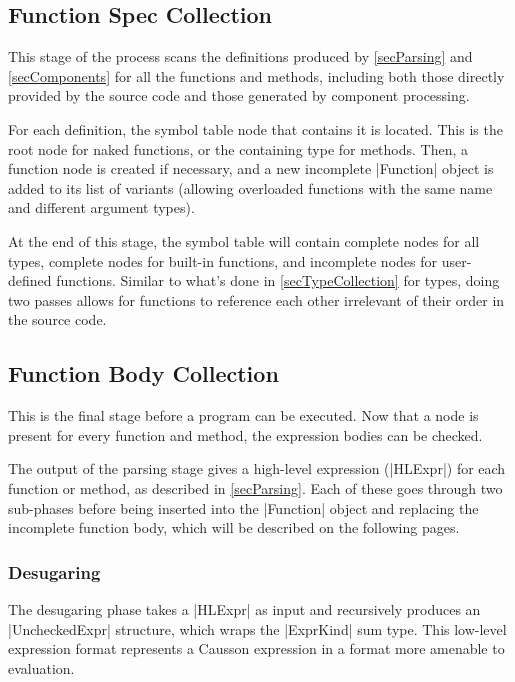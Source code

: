 \documentclass[11pt]{report}
\begin{document}
\subsection{Function Spec Collection} \label{secFuncSpecCollection}

This stage of the process scans the definitions produced by \cref{secParsing} and \cref{secComponents} for all the functions and methods, including both those directly provided by the source code and those generated by component processing.

For each definition, the symbol table node that contains it is located. This is the root node for naked functions, or the containing type for methods. Then, a function node is created if necessary, and a new incomplete |Function| object is added to its list of variants (allowing overloaded functions with the same name and different argument types).

At the end of this stage, the symbol table will contain complete nodes for all types, complete nodes for built-in functions, and incomplete nodes for user-defined functions. Similar to what's done in \cref{secTypeCollection} for types, doing two passes allows for functions to reference each other irrelevant of their order in the source code.

\subsection{Function Body Collection} \label{secFuncBodyCollection}

This is the final stage before a program can be executed. Now that a node is present for every function and method, the expression bodies can be checked.

The output of the parsing stage gives a high-level expression (|HLExpr|) for each function or method, as described in \cref{secParsing}. Each of these goes through two sub-phases before being inserted into the |Function| object and replacing the incomplete function body, which will be described on the following pages.

\subsubsection{Desugaring}

The desugaring phase takes a |HLExpr| as input and recursively produces an |UncheckedExpr| structure, which wraps the |ExprKind| sum type. This low-level expression format represents a Causson expression in a format more amenable to evaluation.
\end{document}
